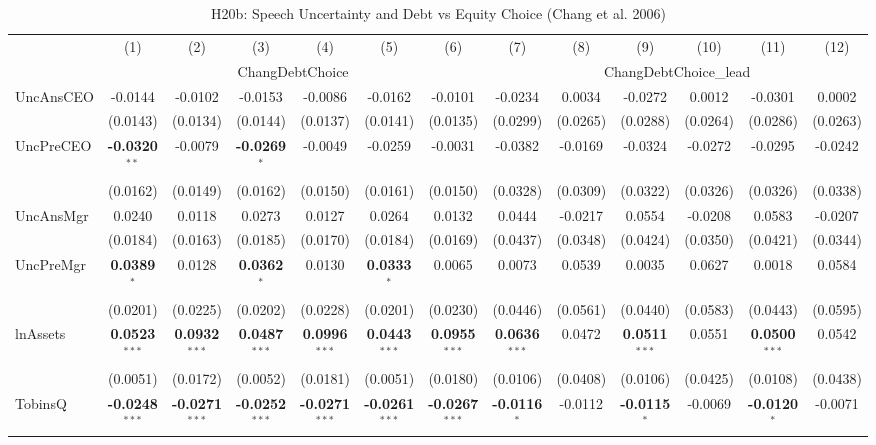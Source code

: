 \documentclass[11pt,a4paper]{article}
\begin{document}
\begin{table}[htbp]
\centering
\caption{H20b: Speech Uncertainty and Debt vs Equity Choice (Chang et al. 2006)}
\label{tab:h20b}
\scriptsize
\begin{tabular}{lcccccccccccc}
\toprule
 & (1) & (2) & (3) & (4) & (5) & (6) & (7) & (8) & (9) & (10) & (11) & (12) \\
 & \multicolumn{6}{c}{ChangDebtChoice} & \multicolumn{6}{c}{ChangDebtChoice\_lead} \\
\cmidrule(lr){2-7} \cmidrule(lr){8-13}
\midrule
UncAnsCEO & -0.0144 & -0.0102 & -0.0153 & -0.0086 & -0.0162 & -0.0101 & -0.0234 & 0.0034 & -0.0272 & 0.0012 & -0.0301 & 0.0002 \\
 & (0.0143) & (0.0134) & (0.0144) & (0.0137) & (0.0141) & (0.0135) & (0.0299) & (0.0265) & (0.0288) & (0.0264) & (0.0286) & (0.0263) \\
UncPreCEO & \textbf{-0.0320}$^{**}$ & -0.0079 & \textbf{-0.0269}$^{*}$ & -0.0049 & -0.0259 & -0.0031 & -0.0382 & -0.0169 & -0.0324 & -0.0272 & -0.0295 & -0.0242 \\
 & (0.0162) & (0.0149) & (0.0162) & (0.0150) & (0.0161) & (0.0150) & (0.0328) & (0.0309) & (0.0322) & (0.0326) & (0.0326) & (0.0338) \\
UncAnsMgr & 0.0240 & 0.0118 & 0.0273 & 0.0127 & 0.0264 & 0.0132 & 0.0444 & -0.0217 & 0.0554 & -0.0208 & 0.0583 & -0.0207 \\
 & (0.0184) & (0.0163) & (0.0185) & (0.0170) & (0.0184) & (0.0169) & (0.0437) & (0.0348) & (0.0424) & (0.0350) & (0.0421) & (0.0344) \\
UncPreMgr & \textbf{0.0389}$^{*}$ & 0.0128 & \textbf{0.0362}$^{*}$ & 0.0130 & \textbf{0.0333}$^{*}$ & 0.0065 & 0.0073 & 0.0539 & 0.0035 & 0.0627 & 0.0018 & 0.0584 \\
 & (0.0201) & (0.0225) & (0.0202) & (0.0228) & (0.0201) & (0.0230) & (0.0446) & (0.0561) & (0.0440) & (0.0583) & (0.0443) & (0.0595) \\
\midrule
lnAssets & \textbf{0.0523}$^{***}$ & \textbf{0.0932}$^{***}$ & \textbf{0.0487}$^{***}$ & \textbf{0.0996}$^{***}$ & \textbf{0.0443}$^{***}$ & \textbf{0.0955}$^{***}$ & \textbf{0.0636}$^{***}$ & 0.0472 & \textbf{0.0511}$^{***}$ & 0.0551 & \textbf{0.0500}$^{***}$ & 0.0542 \\
 & (0.0051) & (0.0172) & (0.0052) & (0.0181) & (0.0051) & (0.0180) & (0.0106) & (0.0408) & (0.0106) & (0.0425) & (0.0108) & (0.0438) \\
TobinsQ & \textbf{-0.0248}$^{***}$ & \textbf{-0.0271}$^{***}$ & \textbf{-0.0252}$^{***}$ & \textbf{-0.0271}$^{***}$ & \textbf{-0.0261}$^{***}$ & \textbf{-0.0267}$^{***}$ & \textbf{-0.0116}$^{*}$ & -0.0112 & \textbf{-0.0115}$^{*}$ & -0.0069 & \textbf{-0.0120}$^{*}$ & -0.0071 \\

\end{tabular}
\end{table}
\end{document}
